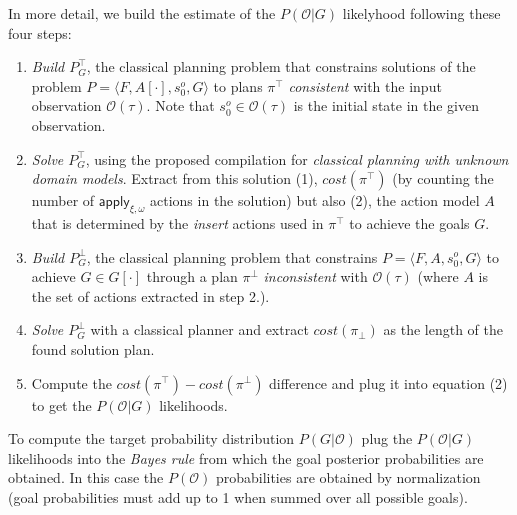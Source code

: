 \documentclass{article}
\newcommand{\tup}[1]{{\langle #1 \rangle}}
\begin{document}
In more detail, we build the estimate of the $P(\mathcal{O}|G)$ likelyhood following these four steps:
\begin{enumerate}
\item {\em Build $P^{\top}_G$}, the classical planning problem that constrains solutions of the problem $P=\tup{F,A[\cdot],s_0^o,G}$ to plans $\pi^\top$ {\em consistent} with the input observation $\mathcal{O}(\tau)$. Note that $s_0^o\in \mathcal{O}(\tau)$ is the initial state in the given observation.
\item {\em Solve $P^{\top}_G$}, using the proposed compilation for {\em classical planning with unknown domain models}. Extract from this solution (1), $cost(\pi^\top)$ (by counting the number of $\mathsf{apply_{\xi,\omega}}$ actions in the solution) but also (2), the action model $A$ that is determined by the {\em insert} actions used in $\pi^\top$ to achieve the goals $G$.
\item {\em Build $P^{\bot}_G$}, the classical planning problem that constrains $P=\tup{F,A,s_0^o,G}$ to achieve $G\in G[\cdot]$ through a plan $\pi^\bot$ {\em inconsistent} with $\mathcal{O}(\tau)$ (where $A$ is the set of actions extracted in step 2.).
\item {\em Solve $P^{\bot}_G$} with a classical planner and extract $cost(\pi_\bot)$ as the length of the found solution plan.
\item Compute the $cost(\pi^\top)-cost(\pi^\bot)$ difference and plug it into equation (2) to get the $P(\mathcal{O}|G)$ likelihoods.
\end{enumerate}

To compute the target probability distribution $P(G|\mathcal{O})$ plug the $P(\mathcal{O}|G)$ likelihoods into the {\em Bayes rule} from which the goal posterior probabilities are obtained. In this case the $P(\mathcal{O})$ probabilities are obtained by normalization (goal probabilities must add up to 1 when summed over all possible goals).
\end{document}
